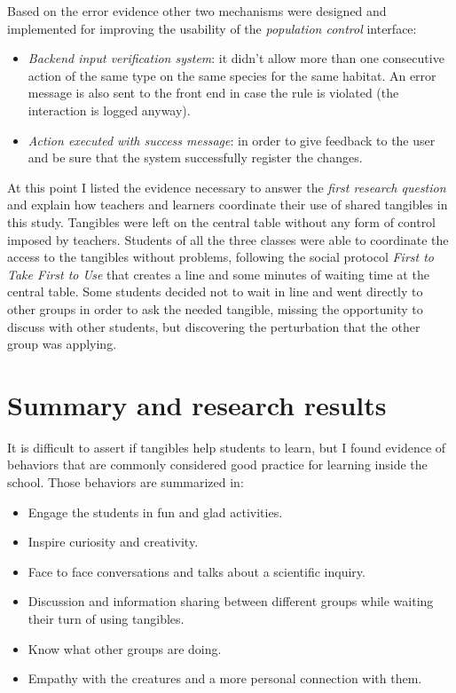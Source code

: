 Based on the error evidence other two mechanisms were designed and implemented for improving the usability of the \textit{population control} interface:
\begin{itemize}
\item \textit{Backend input verification system}: it didn't allow more than one consecutive action of the same type on the same species for the same habitat. An error message is also sent to the front end in case the rule is violated (the interaction is logged anyway).
\item \textit{Action executed with success message}: in order to give feedback \cite{norman:design} to the user and be sure that the system successfully register the changes.
\end{itemize}

At this point I listed the evidence necessary to answer the \textit{first research question} and explain how teachers and learners coordinate their use of shared tangibles in this study. Tangibles were left on the central table without any form of control imposed by teachers. Students of all the three classes were able to coordinate the access to the tangibles without problems, following the social protocol \textit{First to Take First to Use} that creates a line and some minutes of waiting time at the central table. Some students decided not to wait in line and went directly to other groups in order to ask the needed tangible, missing the opportunity to discuss with other students, but discovering the perturbation that the other group was applying.

\section{Summary and research results}

It is difficult to assert if tangibles help students to learn, but I found evidence of behaviors that are commonly considered good practice for learning inside the school. Those behaviors are summarized in:
\begin{itemize}
\item Engage the students in fun and glad activities.
\item Inspire curiosity and creativity.
\item Face to face conversations and talks about a scientific inquiry.
\item Discussion and information sharing between different groups while waiting their turn of using tangibles.
\item Know what other groups are doing.
\item Empathy with the creatures and a more personal connection with them.
\end{itemize}


